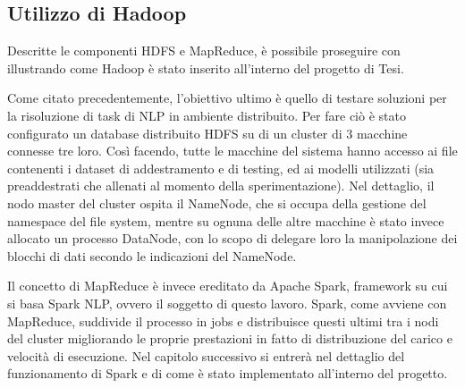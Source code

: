  \subsection{Utilizzo di Hadoop} \label{uso_hadoop}
Descritte le componenti HDFS e MapReduce, è possibile proseguire con illustrando come Hadoop è stato inserito all’interno del progetto di Tesi.

Come citato precedentemente, l’obiettivo ultimo è quello di testare soluzioni per la risoluzione di task di NLP in ambiente distribuito. Per fare ciò è stato configurato un database distribuito HDFS su di un cluster di 3 macchine connesse tre loro. Così facendo, tutte le macchine del sistema hanno accesso ai file contenenti i dataset di addestramento e di testing, ed ai modelli utilizzati (sia preaddestrati che allenati al momento della sperimentazione). Nel dettaglio, il nodo master del cluster ospita il NameNode, che si occupa della gestione del namespace del file system, mentre su ognuna delle altre macchine è stato invece allocato un processo DataNode, con lo scopo di delegare loro la manipolazione dei blocchi di dati secondo le indicazioni del NameNode.

Il concetto di MapReduce è invece ereditato da Apache Spark, framework su cui si basa Spark NLP, ovvero il soggetto di questo lavoro. Spark, come avviene con MapReduce, suddivide il processo in jobs e distribuisce questi ultimi tra i nodi del cluster migliorando le proprie prestazioni in fatto di distribuzione del carico e velocità di esecuzione. Nel capitolo successivo si entrerà nel dettaglio del funzionamento di Spark e di come è stato implementato all’interno del progetto.